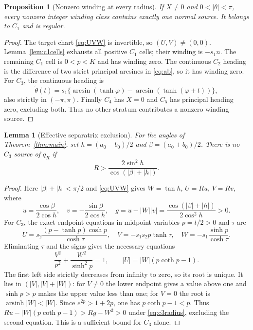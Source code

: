 \documentclass[11pt,a4paper]{article}
\newtheorem{proposition}[theorem]{Proposition}
\newtheorem{lemma}[theorem]{Lemma}
\theoremstyle{remark}\newtheorem{remark}[theorem]{Remark}
\begin{document}
\begin{proposition}[Nonzero winding at every radius]\label{prop:global-winding}
If $X\ne0$ and $0<|\theta|<\pi$, every nonzero integer winding
class contains exactly one normal source. It belongs to $C_1$ and
is regular.
\end{proposition}
\begin{proof}
The target chart \eqref{eq:UVW} is invertible, so $(U,V)\ne(0,0)$.
Lemma~\ref{lem:c1cells} exhausts all positive $C_1$ cells; their
winding is $-s_1n$. The remaining $C_1$ cell is $0<p<K$ and has
winding zero. The continuous $C_2$ heading is the difference of two
strict principal arcsines in \eqref{eq:ab}, so it has winding zero.
For $C_3$, the continuous heading is
\[
 \widetilde\theta(t)
 =s_1\{\arcsin(\tanh\varphi)-\arcsin(\tanh(\varphi+t))\},
\]
also strictly in $(-\pi,\pi)$. Finally $C_4$ has $X=0$ and $C_5$
has principal heading zero, excluding both. Thus no other stratum
contributes a nonzero winding source.
\end{proof}

\begin{lemma}[Effective separatrix exclusion]\label{lem:c3exclude}
For the angles of Theorem~\ref{thm:main}, set
$h=(a_0-b_0)/2$ and $\beta=(a_0+b_0)/2$.
There is no $C_3$ source of $q_R$ if
\begin{equation}\label{eq:c3radius}
 R>\frac{2\sin^2h}{\cos(|\beta|+|h|)}.
\end{equation}
\end{lemma}
\begin{proof}
Here $|\beta|+|h|<\pi/2$ and \eqref{eq:UVW} gives
$W=\tan h$, $U=Ru$, $V=Rv$, where
\[
 u=\frac{\cos\beta}{2\cos h},\quad
 v=-\frac{\sin\beta}{2\cos h},\quad
 g=u-|W||v|=\frac{\cos(|\beta|+|h|)}{2\cos^2h}>0.
\]
For $C_3$, the exact endpoint equations in midpoint variables $p=t/2>0$
and $\tau$ are
\[
 U=s_2\frac{(p-\tanh p)\cosh p}{\cosh\tau},\quad
 V=-s_1s_2p\tanh\tau,\quad W=-s_1\frac{\sinh p}{\cosh\tau}.
\]
Eliminating $\tau$ and the signs gives the necessary equations
\begin{equation}\label{eq:c3surface}
 \frac{V^2}{p^2}+\frac{W^2}{\sinh^2p}=1,\qquad
 |U|=|W|(p\coth p-1).
\end{equation}
The first left side strictly decreases from infinity to zero, so its
root is unique. It lies in $(|V|,|V|+|W|)$: for $V\ne0$ the lower
endpoint gives a value above one and $\sinh p>p$ makes the upper value
less than one; for $V=0$ the root is $\operatorname{arsinh}|W|<|W|$.
Since $e^{2p}>1+2p$, one has $p\coth p-1<p$. Thus
$Ru-|W|(p\coth p-1)>Rg-W^2>0$ under \eqref{eq:c3radius}, excluding
the second equation. This is a sufficient bound for $C_3$ alone.
\end{proof}
\end{document}
